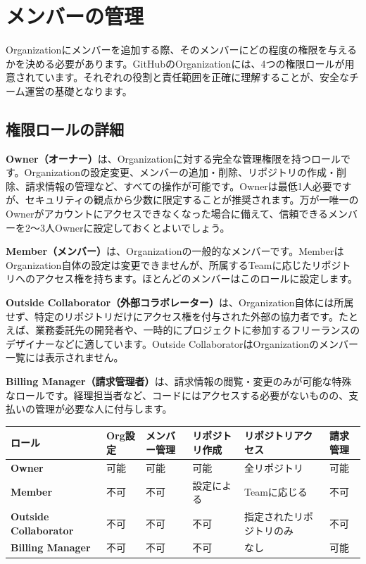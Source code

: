 \section{メンバーの管理}

Organizationにメンバーを追加する際、そのメンバーにどの程度の権限を与えるかを決める必要があります。GitHubのOrganizationには、4つの権限ロールが用意されています。それぞれの役割と責任範囲を正確に理解することが、安全なチーム運営の基礎となります。

\subsection{権限ロールの詳細}

\textbf{Owner（オーナー）}は、Organizationに対する完全な管理権限を持つロールです。Organizationの設定変更、メンバーの追加・削除、リポジトリの作成・削除、請求情報の管理など、すべての操作が可能です。Ownerは最低1人必要ですが、セキュリティの観点から少数に限定することが推奨されます。万が一唯一のOwnerがアカウントにアクセスできなくなった場合に備えて、信頼できるメンバーを2〜3人Ownerに設定しておくとよいでしょう。

\textbf{Member（メンバー）}は、Organizationの一般的なメンバーです。MemberはOrganization自体の設定は変更できませんが、所属するTeamに応じたリポジトリへのアクセス権を持ちます。ほとんどのメンバーはこのロールに設定します。

\textbf{Outside Collaborator（外部コラボレーター）}は、Organization自体には所属せず、特定のリポジトリだけにアクセス権を付与された外部の協力者です。たとえば、業務委託先の開発者や、一時的にプロジェクトに参加するフリーランスのデザイナーなどに適しています。Outside CollaboratorはOrganizationのメンバー一覧には表示されません。

\textbf{Billing Manager（請求管理者）}は、請求情報の閲覧・変更のみが可能な特殊なロールです。経理担当者など、コードにはアクセスする必要がないものの、支払いの管理が必要な人に付与します。

\begin{tabular}{|l|l|l|l|l|l|}
\hline
\textbf{ロール} & \textbf{Org設定} & \textbf{メンバー管理} & \textbf{リポジトリ作成} & \textbf{リポジトリアクセス} & \textbf{請求管理} \\
\hline
\textbf{Owner} & 可能 & 可能 & 可能 & 全リポジトリ & 可能 \\
\hline
\textbf{Member} & 不可 & 不可 & 設定による & Teamに応じる & 不可 \\
\hline
\textbf{Outside Collaborator} & 不可 & 不可 & 不可 & 指定されたリポジトリのみ & 不可 \\
\hline
\textbf{Billing Manager} & 不可 & 不可 & 不可 & なし & 可能 \\
\hline
\end{tabular}


